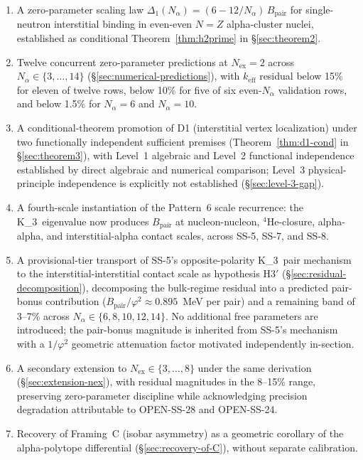 \documentclass[11pt,letterpaper]{article}
\theoremstyle{definition}
\newcommand{\phig}{\varphi}
\newcommand{\Bpair}{B_{\text{pair}}}
\newcommand{\Nalpha}{N_\alpha}
\newcommand{\Nex}{N_{\text{ex}}}
\newcommand{\Kthree}{K_3}
\begin{document}
\begin{enumerate}
  \item A zero-parameter scaling law $\Delta_1(\Nalpha) = (6 - 12/\Nalpha)\,\Bpair$ for single-neutron interstitial binding in even-even $N = Z$ alpha-cluster nuclei, established as conditional Theorem~\ref{thm:h2prime} in \S\ref{sec:theorem2}.
  \item Twelve concurrent zero-parameter predictions at $\Nex = 2$ across $\Nalpha \in \{3, \ldots, 14\}$ (\S\ref{sec:numerical-predictions}), with $k_{\text{eff}}$ residual below 15\% for eleven of twelve rows, below 10\% for five of six even-$\Nalpha$ validation rows, and below 1.5\% for $\Nalpha = 6$ and $\Nalpha = 10$.
  \item A conditional-theorem promotion of D1 (interstitial vertex localization) under two functionally independent sufficient premises (Theorem~\ref{thm:d1-cond} in \S\ref{sec:theorem3}), with Level~1 algebraic and Level~2 functional independence established by direct algebraic and numerical comparison; Level~3 physical-principle independence is explicitly not established (\S\ref{sec:level-3-gap}).
  \item A fourth-scale instantiation of the Pattern~6 scale recurrence: the \Kthree\ eigenvalue now produces $\Bpair$ at nucleon-nucleon, ${}^{4}\mathrm{He}$-closure, alpha-alpha, and interstitial-alpha contact scales, across SS-5, SS-7, and SS-8.
  \item A provisional-tier transport of SS-5's opposite-polarity \Kthree\ pair mechanism to the interstitial-interstitial contact scale as hypothesis H3$'$ (\S\ref{sec:residual-decomposition}), decomposing the bulk-regime residual into a predicted pair-bonus contribution ($\Bpair/\phig^2 \approx 0.895$~MeV per pair) and a remaining band of 3--7\% across $\Nalpha \in \{6, 8, 10, 12, 14\}$. No additional free parameters are introduced; the pair-bonus magnitude is inherited from SS-5's mechanism with a $1/\phig^2$ geometric attenuation factor motivated independently in-section.
  \item A secondary extension to $\Nex \in \{3, \ldots, 8\}$ under the same derivation (\S\ref{sec:extension-nex}), with residual magnitudes in the 8--15\% range, preserving zero-parameter discipline while acknowledging precision degradation attributable to OPEN-SS-28 and OPEN-SS-24.
  \item Recovery of Framing~C (isobar asymmetry) as a geometric corollary of the alpha-polytope differential (\S\ref{sec:recovery-of-C}), without separate calibration.
\end{enumerate}
\end{document}
